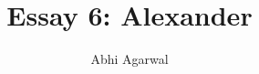 \documentclass[11pt, oneside]{article}
\title{Essay 6: Alexander}
\author{Abhi Agarwal}
\date{}
\begin{document}
\maketitle

\par 
\end{document}
